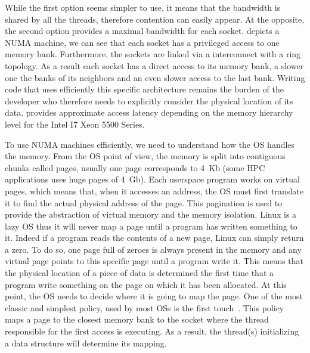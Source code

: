 While the first option seems simpler to use, it means that the bandwidth is shared by all the threads, therefore contention can easily appear.
At the opposite, the second option provides a maximal bandwidth for each socket.
 depicts a \gls{NUMA} machine, we can see that each socket has a privileged access to one memory bank.
Furthermore, the sockets are linked via a interconnect with a ring topology.
As a result each socket  has a direct access to its memory bank, a slower one the banks of its neighbors and an even slower access to the last bank.
Writing code that uses efficiently this specific architecture remains the burden of the developer who therefore needs to explicitly consider the physical location of its data.
 provides approximate access latency depending on the memory hierarchy level for  the \gls{Intel} I7 Xeon 5500 Series.

To use \gls{NUMA} machines efficiently, we need to understand how the \gls{OS} handles the memory.
From the \gls{OS} point of view, the memory is split into contiguous chunks called pages, usually one page corresponds to \SI{4}{Kb} (some \gls{HPC} applications uses huge pages of \SI{4}{Gb}).
Each userspace program works on virtual pages, which means that, when it accesses an address, the \gls{OS} must first translate it to find the actual physical address of the page.
This pagination is used to provide the abstraction of virtual memory and the memory isolation.
\gls{Linux} is a lazy \gls{OS} thus it will never map a page until a program has written something to it.
Indeed if a program reads the contents of a new page, \gls{Linux} can simply return a zero.
To do so, one page full of zeroes is always present in the memory and any virtual page points to this specific page until a program write it.
This means that the physical location of a piece of data is determined the first time that a program write something on the page on which it has been allocated.
At this point, the \gls{OS} needs to decide where it is going to map the page.
One of the most classic and simplest policy, used by most \glspl{OS} is the first touch~\cite{Marchetti95Using}.
This policy maps a page to the closest memory bank to the socket where the thread responsible for the first access is executing.
As a result, the thread(s) initializing a data structure will determine its mapping.

